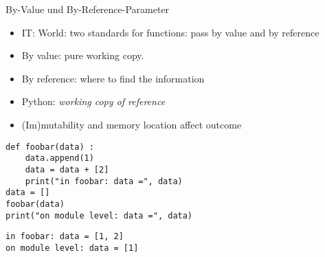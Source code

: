 
\begin{frame}[fragile]{By-Value und By-Reference-Parameter}
%
\begin{itemize}
\item IT: World: two standards for functions: pass by value and by reference
\item By value: pure working copy.
\item By reference: where to find the information
\item Python: \emph{working copy of reference}
\item (Im)mutability and memory location affect outcome
\end{itemize}
%
\begin{tcbraster}[raster columns=2,
                  raster equal height,
                  nobeforeafter,
                  raster column skip=0.5cm]
\begin{codebox}
\begin{verbatim}
def foobar(data) :
    data.append(1)
    data = data + [2]
    print("in foobar: data =", data)
data = []
foobar(data)
print("on module level: data =", data)
\end{verbatim}
\end{codebox}
%
\begin{cmdbox}
\begin{verbatim}
in foobar: data = [1, 2]
on module level: data = [1]
\end{verbatim}
\end{cmdbox}
\end{tcbraster}
%
\end{frame}


